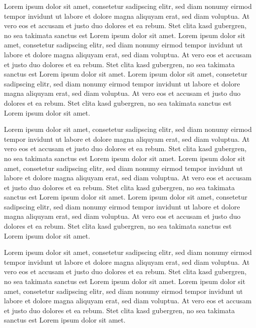 \documentclass{vgtc}                          %
\begin{document}
Lorem ipsum dolor sit amet, consetetur sadipscing elitr, sed diam
nonumy eirmod tempor invidunt ut labore et dolore magna aliquyam erat,
sed diam voluptua. At vero eos et accusam et justo duo dolores et ea
rebum. Stet clita kasd gubergren, no sea takimata sanctus est Lorem
ipsum dolor sit amet. Lorem ipsum dolor sit amet, consetetur
sadipscing elitr, sed diam nonumy eirmod tempor invidunt ut labore et
dolore magna aliquyam erat, sed diam voluptua. At vero eos et accusam
et justo duo dolores et ea rebum. Stet clita kasd gubergren, no sea
takimata sanctus est Lorem ipsum dolor sit amet. Lorem ipsum dolor sit
amet, consetetur sadipscing elitr, sed diam nonumy eirmod tempor
invidunt ut labore et dolore magna aliquyam erat, sed diam
voluptua. At vero eos et accusam et justo duo dolores et ea
rebum. Stet clita kasd gubergren, no sea takimata sanctus est Lorem
ipsum dolor sit amet.

Lorem ipsum dolor sit amet, consetetur sadipscing elitr, sed diam
nonumy eirmod tempor invidunt ut labore et dolore magna aliquyam erat,
sed diam voluptua. At vero eos et accusam et justo duo dolores et ea
rebum. Stet clita kasd gubergren, no sea takimata sanctus est Lorem
ipsum dolor sit amet. Lorem ipsum dolor sit amet, consetetur
sadipscing elitr, sed diam nonumy eirmod tempor invidunt ut labore et
dolore magna aliquyam erat, sed diam voluptua. At vero eos et accusam
et justo duo dolores et ea rebum. Stet clita kasd gubergren, no sea
takimata sanctus est Lorem ipsum dolor sit amet. Lorem ipsum dolor sit
amet, consetetur sadipscing elitr, sed diam nonumy eirmod tempor
invidunt ut labore et dolore magna aliquyam erat, sed diam
voluptua. At vero eos et accusam et justo duo dolores et ea
rebum. Stet clita kasd gubergren, no sea takimata sanctus est Lorem
ipsum dolor sit amet.

Lorem ipsum dolor sit amet, consetetur sadipscing elitr, sed diam
nonumy eirmod tempor invidunt ut labore et dolore magna aliquyam erat,
sed diam voluptua. At vero eos et accusam et justo duo dolores et ea
rebum. Stet clita kasd gubergren, no sea takimata sanctus est Lorem
ipsum dolor sit amet. Lorem ipsum dolor sit amet, consetetur
sadipscing elitr, sed diam nonumy eirmod tempor invidunt ut labore et
dolore magna aliquyam erat, sed diam voluptua. At vero eos et accusam
et justo duo dolores et ea rebum. Stet clita kasd gubergren, no sea
takimata sanctus est Lorem ipsum dolor sit amet. 
\end{document}
